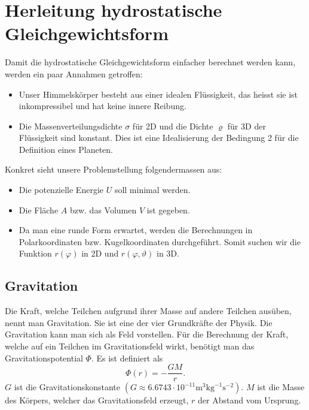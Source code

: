 %
%
%
%
\section{Herleitung hydrostatische Gleichgewichtsform
\label{planet:section:teil1}}
Damit die hydrostatische Gleichgewichtsform einfacher berechnet werden kann, werden ein paar Annahmen getroffen:
\begin{itemize}
	\item Unser Himmelskörper besteht aus einer idealen Flüssigkeit, das heisst sie ist inkompressibel und hat keine innere Reibung.
%
%
	\item Die Massenverteilungsdichte \(\sigma\) für 2D und die Dichte \(\varrho\) für 3D der Flüssigkeit sind konstant.
	Dies ist eine Idealisierung der Bedingung 2 für die Definition eines Planeten.
\end{itemize}
Konkret sieht unsere Problemstellung folgendermassen aus:
\begin{itemize}
	\item Die potenzielle Energie \(U\) soll minimal werden.
%
	\item Die Fläche \(A\) bzw. das Volumen \(V\) ist gegeben.
	\item Da man eine runde Form erwartet, werden die Berechnungen in Polarkoordinaten bzw. Kugelkoordinaten durchgeführt. Somit suchen wir die Funktion \(r(\varphi)\) in 2D und \(r(\varphi,\vartheta)\) in 3D.
\end{itemize}

\subsection{Gravitation}

Die Kraft, welche Teilchen aufgrund ihrer Masse auf andere Teilchen ausüben, nennt man Gravitation.
Sie ist eine der vier Grundkräfte der Physik.
Die Gravitation kann man sich als Feld vorstellen.
Für die Berechnung der Kraft, welche auf ein Teilchen im Gravitationsfeld wirkt, benötigt man das Gravitationspotential \(\Phi\).
Es ist definiert als
\begin{equation}
	\Phi(r) = -\frac{GM}{r}.
	\label{planet:equ:gravpot}
\end{equation}
\(G\) ist die Gravitationskonstante \((G \approx 6.6743 \cdot 10^{-11} \text{m}^3 \text{kg}^{-1} \text{s}^{-2})\).
\(M\) ist die Masse des Körpers, welcher das Gravitationsfeld erzeugt, \(r\) der Abstand vom Ursprung.

